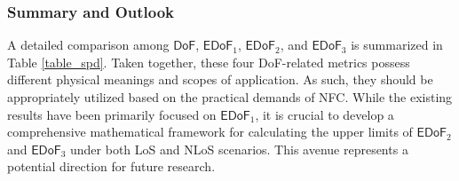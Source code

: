 \documentclass[journal]{IEEEtran}
\theoremstyle{definition}
\begin{document}
\subsubsection{Summary and Outlook}
A detailed comparison among ${\mathsf{DoF}}$, ${\mathsf{EDoF}}_1$, ${\mathsf{EDoF}}_2$, and ${\mathsf{EDoF}}_3$ is summarized in Table \ref{table_spd}. Taken together, these four DoF-related metrics possess different physical meanings and scopes of application. As such, they should be appropriately utilized based on the practical demands of NFC.
While the existing results have been primarily focused on ${\mathsf{EDoF}}_1$, it is crucial to develop a comprehensive mathematical framework for calculating the upper limits of ${\mathsf{EDoF}}_2$ and ${\mathsf{EDoF}}_3$ under both LoS and NLoS scenarios. This avenue represents a potential direction for future research. %


%
%
\end{document}
